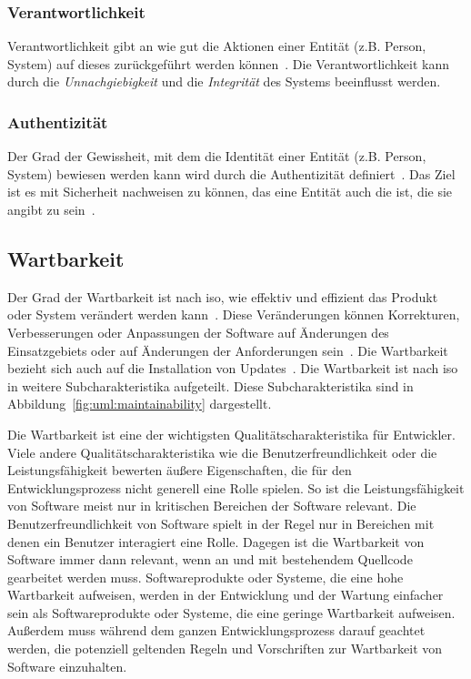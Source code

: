 \documentclass[12pt, a4paper, ngerman]{article}
\begin{document}
\subsubsection{Verantwortlichkeit}

Verantwortlichkeit gibt an wie gut die Aktionen einer Entität (z.B. Person, System) auf dieses zurückgeführt werden können~\cite{ISO25010}.
Die Verantwortlichkeit kann durch die \emph{Unnachgiebigkeit} und die \emph{Integrität} des Systems beeinflusst werden. 

\subsubsection{Authentizität}
Der Grad der Gewissheit, mit dem die Identität einer Entität (z.B. Person, System) 
bewiesen werden kann wird durch die Authentizität definiert~\cite{ISO25010}.
Das Ziel ist es mit Sicherheit nachweisen zu können, das eine Entität auch die ist, die sie angibt zu sein~\cite{ISO27000}.

\subsection{Wartbarkeit}
\label{sec:wartbarkeit}

Der Grad der Wartbarkeit ist nach \ac{iso},
wie effektiv und effizient das Produkt oder System verändert werden kann~\cite{ISO25010}.
Diese Veränderungen können Korrekturen, Verbesserungen
oder Anpassungen der Software auf Änderungen des Einsatzgebiets
oder auf Änderungen der Anforderungen sein~\cite{ISO25010}.
Die Wartbarkeit bezieht sich auch auf die Installation von Updates~\cite{ISO25010}.
Die Wartbarkeit ist nach \ac{iso} in weitere Subcharakteristika aufgeteilt.
Diese Subcharakteristika sind in Abbildung~\ref{fig:uml:maintainability} dargestellt.

Die Wartbarkeit ist eine der wichtigsten Qualitätscharakteristika für Entwickler.
Viele andere Qualitätscharakteristika wie 
die Benutzerfreundlichkeit oder die Leistungsfähigkeit
bewerten äußere Eigenschaften,
die für den Entwicklungsprozess nicht generell eine Rolle spielen.
So ist die Leistungsfähigkeit von Software 
meist nur in kritischen Bereichen der Software relevant.
Die Benutzerfreundlichkeit von Software spielt 
in der Regel nur in Bereichen mit denen ein Benutzer interagiert eine Rolle.
Dagegen ist die Wartbarkeit von Software
immer dann relevant, 
wenn an und mit bestehendem Quellcode gearbeitet werden muss.
Softwareprodukte oder Systeme,
die eine hohe Wartbarkeit aufweisen,
werden in der Entwicklung und der Wartung einfacher sein
als Softwareprodukte oder Systeme,
die eine geringe Wartbarkeit aufweisen.
Außerdem muss während dem ganzen Entwicklungsprozess
darauf geachtet werden, die potenziell geltenden 
Regeln und Vorschriften zur Wartbarkeit von Software einzuhalten.
\end{document}

